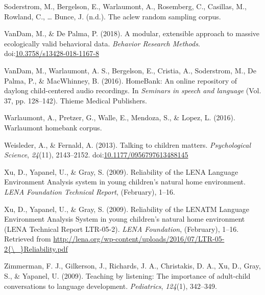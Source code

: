 \documentclass[english,table,man,floatsintext]{apa6}
\begin{document}
\leavevmode\hypertarget{ref-soderstrom}{}%
Soderstrom, M., Bergelson, E., Warlaumont, A., Rosemberg, C., Casillas, M., Rowland, C., \ldots{} Bunce, J. (n.d.). The aclew random sampling corpus.

\leavevmode\hypertarget{ref-VanDam2018}{}%
VanDam, M., \& De Palma, P. (2018). A modular, extensible approach to massive ecologically valid behavioral data. \emph{Behavior Research Methods}. doi:\href{https://doi.org/10.3758/s13428-018-1167-8}{10.3758/s13428-018-1167-8}

\leavevmode\hypertarget{ref-vandam2016homebank}{}%
VanDam, M., Warlaumont, A. S., Bergelson, E., Cristia, A., Soderstrom, M., De Palma, P., \& MacWhinney, B. (2016). HomeBank: An online repository of daylong child-centered audio recordings. In \emph{Seminars in speech and language} (Vol. 37, pp. 128--142). Thieme Medical Publishers.

\leavevmode\hypertarget{ref-warlaumont2016warlaumont}{}%
Warlaumont, A., Pretzer, G., Walle, E., Mendoza, S., \& Lopez, L. (2016). Warlaumont homebank corpus.

\leavevmode\hypertarget{ref-Weisleder2013a}{}%
Weisleder, A., \& Fernald, A. (2013). Talking to children matters. \emph{Psychological Science}, \emph{24}(11), 2143--2152. doi:\href{https://doi.org/10.1177/0956797613488145}{10.1177/0956797613488145}

\leavevmode\hypertarget{ref-Xu2009}{}%
Xu, D., Yapanel, U., \& Gray, S. (2009). Reliability of the LENA Language Environment Analysis system in young children's natural home environment. \emph{LENA Foundation Technical Report}, (February), 1--16.

\leavevmode\hypertarget{ref-Xu2009a}{}%
Xu, D., Yapanel, U., \& Gray, S. (2009). Reliability of the LENATM Language Environment Analysis System in young children's natural home environment (LENA Technical Report LTR-05-2). \emph{LENA Foundation}, (February), 1--16. Retrieved from \href{http://lena.org/wp-content/uploads/2016/07/LTR-05-2\%7B/_\%7DReliability.pdf}{http://lena.org/wp-content/uploads/2016/07/LTR-05-2\{\textbackslash{}\_\}Reliability.pdf}

\leavevmode\hypertarget{ref-zimmerman2009}{}%
Zimmerman, F. J., Gilkerson, J., Richards, J. A., Christakis, D. A., Xu, D., Gray, S., \& Yapanel, U. (2009). Teaching by listening: The importance of adult-child conversations to language development. \emph{Pediatrics}, \emph{124}(1), 342--349.
\end{document}
